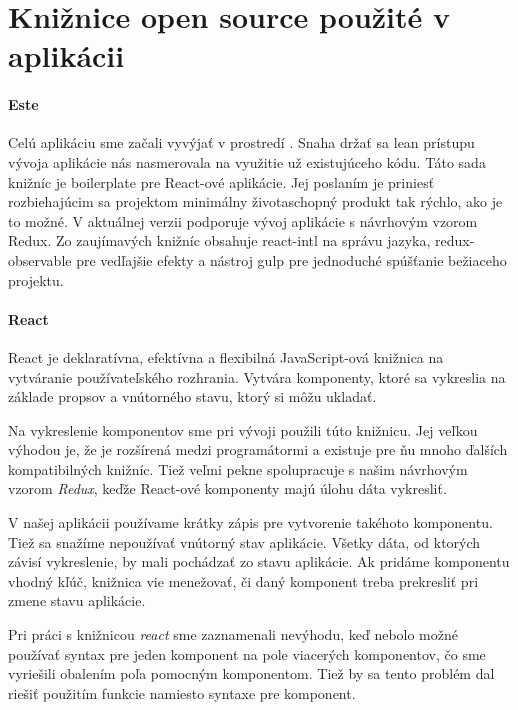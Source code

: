 \section{Knižnice open source použité v aplikácii}%

\paragraph{Este}
\NEW{}%
Celú aplikáciu sme začali vyvýjať v prostredí \cite[este]{Este}. Snaha držať sa lean prístupu vývoja aplikácie nás nasmerovala na využitie už existujúceho kódu. Táto sada knižníc je boilerplate pre React-ové aplikácie. Jej poslaním je priniesť rozbiehajúcim sa projektom minimálny životaschopný produkt tak rýchlo, ako je to možné. V aktuálnej verzii podporuje vývoj aplikácie s návrhovým vzorom Redux. Zo zaujímavých knižníc obsahuje react-intl na správu jazyka, redux-observable pre vedľajšie efekty a nástroj gulp pre jednoduché spúšťanie bežiaceho projektu.

\paragraph{React}
\NEW{} %
React \cite{react} je deklaratívna, efektívna a flexibilná JavaScript-ová knižnica na vytváranie používateľského rozhrania. Vytvára komponenty, ktoré sa vykreslia na základe propsov a vnútorného stavu, ktorý si môžu ukladať. 

Na vykreslenie komponentov sme pri vývoji použili túto knižnicu. Jej veľkou výhodou je, že je rozšírená medzi programátormi a existuje pre ňu mnoho ďalších kompatibilných knižníc. Tiež veľmi pekne spolupracuje s našim návrhovým vzorom \emph{Redux}, keďže React-ové komponenty majú úlohu dáta vykresliť.

V našej aplikácii používame krátky zápis pre vytvorenie takéhoto komponentu. Tiež sa snažíme nepoužívať vnútorný stav aplikácie. Všetky dáta, od ktorých závisí vykreslenie, by mali pochádzať zo stavu aplikácie. Ak pridáme komponentu vhodný kľúč, knižnica vie menežovať, či daný komponent treba prekresliť pri zmene stavu aplikácie.

Pri práci s knižnicou \emph{react} sme zaznamenali nevýhodu, keď nebolo možné používať syntax pre jeden komponent na pole viacerých komponentov, čo sme vyriešili obalením poľa pomocným komponentom. Tiež by sa tento problém dal riešiť použitím funkcie namiesto syntaxe pre komponent.

